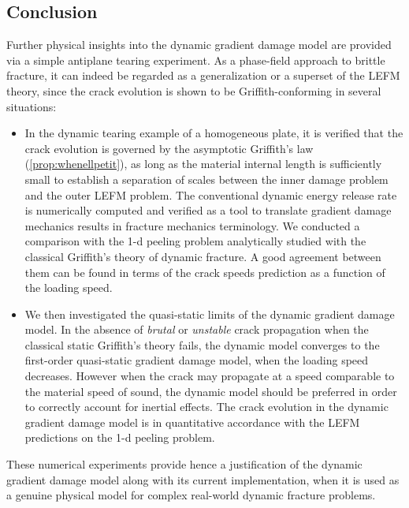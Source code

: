 \subsection*{Conclusion}
Further physical insights into the dynamic gradient damage model are provided via a simple antiplane tearing experiment. As a phase-field approach to brittle fracture, it can indeed be regarded as a generalization or a superset of the LEFM theory, since the crack evolution is shown to be Griffith-conforming in several situations:
\begin{itemize}
\item In the dynamic tearing example of a homogeneous plate, it is verified that the crack evolution is governed by the asymptotic Griffith's law (\cref{prop:whenellpetit}), as long as the material internal length is sufficiently small to establish a separation of scales between the inner damage problem and the outer LEFM problem. The conventional dynamic energy release rate is numerically computed and verified as a tool to translate gradient damage mechanics results in fracture mechanics terminology. We conducted a comparison with the 1-d peeling problem \cite{DumouchelMarigoCharlotte:2008} analytically studied with the classical Griffith's theory of dynamic fracture. A good agreement between them can be found in terms of the crack speeds prediction as a function of the loading speed.

\item We then investigated the quasi-static limits of the dynamic gradient damage model. In the absence of \emph{brutal} or \emph{unstable} crack propagation when the classical static Griffith's theory fails, the dynamic model converges to the first-order quasi-static gradient damage model, when the loading speed decreases. However when the crack may propagate at a speed comparable to the material speed of sound, the dynamic model should be preferred in order to correctly account for inertial effects. The crack evolution in the dynamic gradient damage model is in quantitative accordance with the LEFM predictions on the 1-d peeling problem.
\end{itemize}

These numerical experiments provide hence a justification of the dynamic gradient damage model along with its current implementation, when it is used as a genuine physical model for complex real-world dynamic fracture problems.

